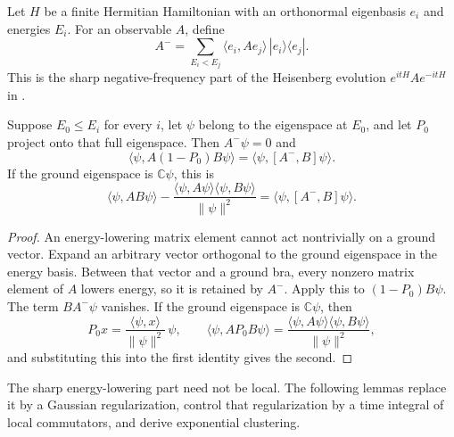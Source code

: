 \begin{definition}
    \label{def:hk_negative_frequency_part}
    \leanok
    Let $H$ be a finite Hermitian Hamiltonian with an orthonormal
    eigenbasis $e_i$ and energies $E_i$. For an observable $A$, define
    \[
        A^- = \sum_{E_i<E_j}
        \langle e_i,Ae_j\rangle\,|e_i\rangle\langle e_j|.
    \]
    This is the sharp negative-frequency part of the Heisenberg
    evolution $e^{itH}Ae^{-itH}$ in
    \cite[Section 3, equations (3.1)--(3.6)]{Hastings2006Spectral}.
\end{definition}

\begin{lemma}
    \label{lem:hk_negative_frequency_ground_correlation}
    \leanok
    Suppose $E_0\le E_i$ for every $i$, let $\psi$ belong to the
    eigenspace at $E_0$, and let $P_0$ project onto that full eigenspace.
    Then $A^-\psi=0$ and
    \[
        \langle\psi,A(1-P_0)B\psi\rangle
        =\langle\psi,[A^-,B]\psi\rangle.
    \]
    If the ground eigenspace is $\mathbb C\psi$, this is
    \[
        \langle\psi,AB\psi\rangle-
        \frac{\langle\psi,A\psi\rangle\langle\psi,B\psi\rangle}
        {\|\psi\|^2}
        =\langle\psi,[A^-,B]\psi\rangle.
    \]
\end{lemma}
\begin{proof}\leanok
    An energy-lowering matrix element cannot act nontrivially on a
    ground vector. Expand an arbitrary vector orthogonal to the ground
    eigenspace in the energy basis. Between that vector and a ground
    bra, every nonzero matrix element of $A$ lowers energy, so it is
    retained by $A^-$. Apply this to $(1-P_0)B\psi$.
    The term $BA^-\psi$ vanishes. If the ground eigenspace is
    $\mathbb C\psi$, then
    \[
        P_0x=\frac{\langle\psi,x\rangle}{\|\psi\|^2}\,\psi,
        \qquad
        \langle\psi,AP_0B\psi\rangle
        =\frac{\langle\psi,A\psi\rangle\langle\psi,B\psi\rangle}{\|\psi\|^2},
    \]
    and substituting this into the first identity gives the second.
\end{proof}

The sharp energy-lowering part need not be local. The following lemmas
replace it by a Gaussian regularization, control that regularization by a
time integral of local commutators, and derive exponential clustering.

